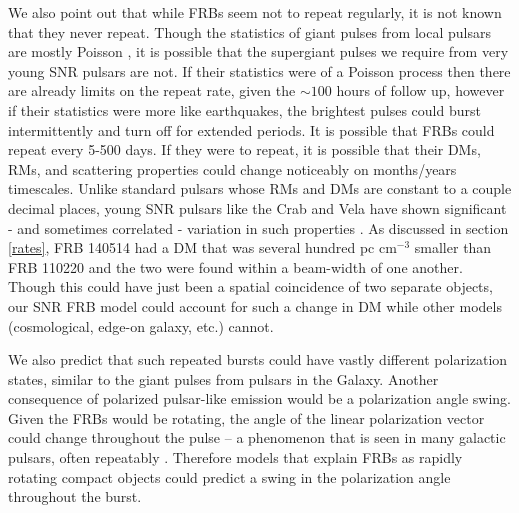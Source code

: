 \documentclass[useAMS,usenatbib]{mn2e}
\begin{document}

We also point out that while FRBs seem not to repeat regularly, 
it is not known that they never repeat. Though the statistics 
of giant pulses from local pulsars are mostly Poisson \citep{1999ApJ...517..460S},
it is possible that 
the supergiant pulses we require from very young SNR pulsars are not. If their 
statistics were of a Poisson process then there are already limits on the repeat rate, 
given the $\sim100$ hours of follow up, however if their statistics were more like
earthquakes, the brightest pulses could burst intermittently and turn off
for extended periods. It is possible that FRBs could repeat every 5-500 days. 
If they were to repeat,
it is possible that their DMs, RMs, and scattering properties could 
change noticeably on months/years timescales. Unlike standard pulsars 
whose RMs and DMs are constant to a couple decimal places, young 
SNR pulsars like the Crab and Vela have shown significant - and sometimes
correlated - variation in such properties \citep{1988A&A...202..166R}.
As discussed in section \ref{rates}, FRB 140514 had a DM that was several hundred
pc cm$^{-3}$ smaller than FRB 110220 and the two were found within a beam-width 
of one another. Though this could have just been a spatial coincidence of two
separate objects, our SNR FRB model 
could account for such a change in DM while other models (cosmological, edge-on 
galaxy, etc.) cannot. 

We also predict that such repeated 
bursts could have vastly different polarization states, similar to the giant 
pulses from pulsars in the Galaxy. Another consequence of polarized 
pulsar-like emission would be a polarization angle swing. Given the FRBs
would be rotating, the angle of the linear polarization vector could 
change throughout the pulse -- a phenomenon that is seen in many 
galactic pulsars, often repeatably \citep{2006ApJ...645.1421B}. Therefore models 
that explain FRBs as rapidly rotating compact objects could predict a swing in the 
polarization angle throughout the burst.
\end{document}
